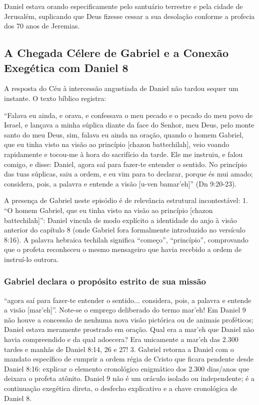 \documentclass[11pt,a4paper,openany]{book}
\begin{document}
Daniel estava orando especificamente pelo santuário terrestre e pela cidade de Jerusalém, suplicando que Deus fizesse cessar a sua desolação conforme a profecia dos 70 anos de Jeremias.



\subsection{A Chegada Célere de Gabriel e a Conexão Exegética com Daniel 8}


A resposta do Céu à intercessão angustiada de Daniel não tardou sequer um instante. O texto bíblico registra:

``Falava eu ainda, e orava, e confessava o meu pecado e o pecado do meu povo de Israel, e lançava a minha súplica diante da face do Senhor, meu Deus, pelo monte santo do meu Deus, sim, falava eu ainda na oração, quando o homem Gabriel, que eu tinha visto na visão ao princípio [chazon battechilah], veio voando rapidamente e tocou-me à hora do sacrifício da tarde. Ele me instruiu, e falou comigo, e disse: Daniel, agora saí para fazer-te entender o sentido. No princípio das tuas súplicas, saiu a ordem, e eu vim para to declarar, porque és mui amado; considera, pois, a palavra e entende a visão [u-ven bamar'eh]'' (Dn 9:20-23).

A presença de Gabriel neste episódio é de relevância estrutural incontestável:
1. ``O homem Gabriel, que eu tinha visto na visão ao princípio [chazon battechilah]'': Daniel vincula de modo explícito a identidade do anjo à visão anterior do capítulo 8 (onde Gabriel fora formalmente introduzido no versículo 8:16). A palavra hebraica techilah significa ``começo'', ``princípio'', comprovando que o profeta reconheceu o mesmo mensageiro que havia recebido a ordem de instruí-lo outrora.

\subsubsection*{Gabriel declara o propósito estrito de sua missão}
``agora saí para fazer-te entender o sentido... considera, pois, a palavra e entende a visão [mar'eh]''. Note-se o emprego deliberado do termo mar'eh! Em Daniel 9 não houve a concessão de nenhuma nova visão pictórica ou de animais proféticos; Daniel estava meramente prostrado em oração. Qual era a mar'eh que Daniel não havia compreendido e da qual adoecera? Era unicamente a mar'eh das 2.300 tardes e manhãs de Daniel 8:14, 26 e 27!
3. Gabriel retorna a Daniel com o mandato específico de cumprir a ordem régia de Cristo que ficara pendente desde Daniel 8:16: explicar o elemento cronológico enigmático dos 2.300 dias/anos que deixara o profeta atônito. Daniel 9 não é um oráculo isolado ou independente; é a continuação exegética direta, o desfecho explicativo e a chave cronológica de Daniel 8.
\end{document}
